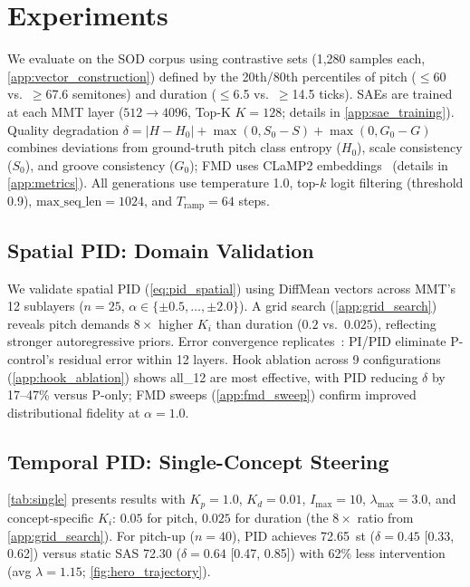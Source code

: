 \documentclass{article}
\theoremstyle{plain}
\begin{document}
\section{Experiments}
\label{sec:experiments}

We evaluate on the SOD corpus using contrastive sets (1,280 samples each, \cref{app:vector_construction}) defined by the 20th/80th percentiles of pitch ($\leq$60 vs.\ $\geq$67.6 semitones) and duration ($\leq$6.5 vs.\ $\geq$14.5 ticks). SAEs are trained at each MMT layer ($512 {\to} 4096$, Top-K $K{=}128$; details in \cref{app:sae_training}). Quality degradation $\delta = |H - H_0| + \max(0, S_0 - S) + \max(0, G_0 - G)$ combines deviations from ground-truth pitch class entropy ($H_0$), scale consistency ($S_0$), and groove consistency ($G_0$); FMD uses CLaMP2 embeddings~\cite{wu2024clamp2} (details in \cref{app:metrics}). All generations use temperature 1.0, top-$k$ logit filtering (threshold 0.9), $\text{max\_seq\_len}{=}1024$, and $T_\text{ramp}{=}64$ steps.

\subsection{Spatial PID: Domain Validation}
\label{sec:spatial_results}

We validate spatial PID (\cref{eq:pid_spatial}) using DiffMean vectors across MMT's 12 sublayers ($n{=}25$, $\alpha \in \{\pm 0.5, \ldots, \pm 2.0\}$). A grid search (\cref{app:grid_search}) reveals pitch demands $8{\times}$ higher $K_i$ than duration ($0.2$ vs.\ $0.025$), reflecting stronger autoregressive priors. Error convergence replicates~\citet{nguyen2026pid}: PI/PID eliminate P-control's residual error within 12 layers. Hook ablation across 9 configurations (\cref{app:hook_ablation}) shows all\_12 are most effective, with PID reducing $\delta$ by 17--47\% versus P-only; FMD sweeps (\cref{app:fmd_sweep}) confirm improved distributional fidelity at $\alpha{=}1.0$.

\subsection{Temporal PID: Single-Concept Steering}
\label{sec:single}

\cref{tab:single} presents results with $K_p{=}1.0$, $K_d{=}0.01$, $I_\text{max}{=}10$, $\lambda_\text{max}{=}3.0$, and concept-specific $K_i$: $0.05$ for pitch, $0.025$ for duration (the $8{\times}$ ratio from \cref{app:grid_search}). For pitch-up ($n{=}40$), PID achieves 72.65~st ($\delta{=}0.45$ [0.33, 0.62]) versus static SAS 72.30 ($\delta{=}0.64$ [0.47, 0.85]) with 62\% less intervention (avg $\lambda{=}1.15$; \cref{fig:hero_trajectory}).
\end{document}
